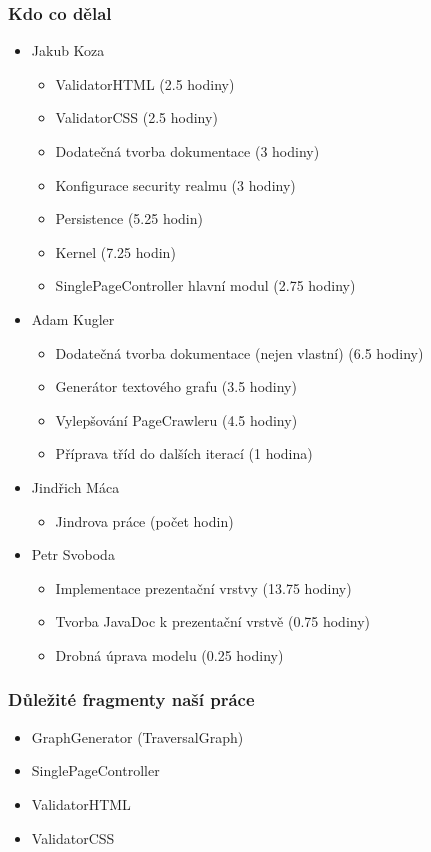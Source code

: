 \documentclass{beamer}
\begin{document}
\begin{frame}[allowframebreaks]\frametitle{Kdo co dělal} 
  \begin{itemize}
    \item Jakub Koza
      \begin{itemize}
       \item ValidatorHTML (2.5 hodiny)
			 \item ValidatorCSS (2.5 hodiny)
			 \item Dodatečná tvorba dokumentace (3 hodiny)
			 \item Konfigurace security realmu (3 hodiny)
			 \item Persistence (5.25 hodin)
			 \item Kernel (7.25 hodin)
			 \item SinglePageController hlavní modul (2.75 hodiny)
     \end{itemize}

    \item Adam Kugler
      \begin{itemize}
       \item Dodatečná tvorba dokumentace (nejen vlastní) (6.5 hodiny)
       \item Generátor textového grafu (3.5 hodiny)
       \item Vylepšování PageCrawleru (4.5 hodiny)
       \item Příprava tříd do dalších iterací (1 hodina)
     \end{itemize}

    \item Jindřich Máca
      \begin{itemize}
       \item Jindrova práce (počet hodin)
     \end{itemize}

    \item Petr Svoboda
      \begin{itemize}
       \item Implementace prezentační vrstvy (13.75 hodiny)
       \item Tvorba JavaDoc k prezentační vrstvě (0.75 hodiny)
       \item Drobná úprava modelu (0.25 hodiny)
     \end{itemize}
   \end{itemize}  
\end{frame} 

\begin{frame}[allowframebreaks]\frametitle{Důležité fragmenty naší práce}
  \begin{itemize}
    \item GraphGenerator (TraversalGraph)
		\item SinglePageController
		\item ValidatorHTML
		\item ValidatorCSS
  \end{itemize}
\end{frame}
\end{document}
